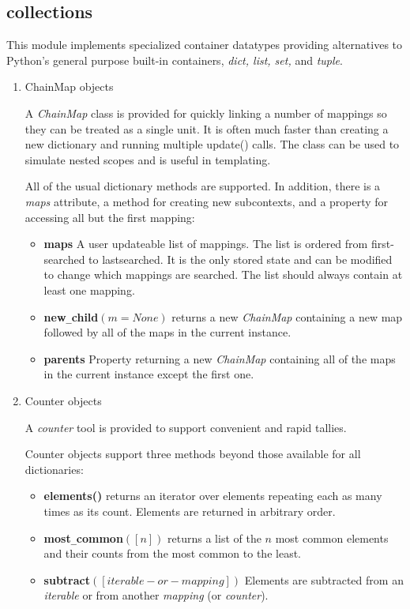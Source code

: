\subsection{collections}
This module implements specialized container datatypes providing alternatives to Python’s general purpose built-in containers, \textit{dict, list, set,} and \textit{tuple}.
\begin{enumerate}
\item ChainMap objects

A \textit{ChainMap} class is provided for quickly linking a number of mappings so they can be treated as a single unit. It is often much faster than creating a new dictionary and running multiple update() calls. The class can be used to simulate nested scopes and is useful in templating.

All of the usual dictionary methods are supported. In addition, there is a \textit{maps} attribute, a method for creating new subcontexts, and a property for accessing all but the first mapping:
\begin{itemize}
\item \textbf{maps} A user updateable list of mappings. The list is ordered from first-searched to lastsearched. It is the only stored state and can be modified to change which mappings are searched. The list should always contain at least one mapping.
\item \textbf{new}\verb?_?\textbf{child}$(m=None)$ returns a new \textit{ChainMap} containing a new map followed by all of the maps in the current instance.
\item \textbf{parents} Property returning a new \textit{ChainMap} containing all of the maps in the current instance except the first one.
\end{itemize}

\item Counter objects

A \textit{counter} tool is provided to support convenient and rapid tallies.

Counter objects support three methods beyond those available for all dictionaries:
\begin{itemize}
\item \textbf{elements()} returns an iterator over elements repeating each as many times as its count. Elements are returned in arbitrary order.
\item \textbf{most}\verb?_?\textbf{common}$([n])$ returns a list of the $n$ most common elements and their counts from the most common to the least. 
\item \textbf{subtract}$([iterable-or-mapping])$ Elements are subtracted from an \textit{iterable} or from another \textit{mapping} (or \textit{counter}).
\end{itemize}


\end{enumerate}
